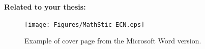 \textbf{Related to your thesis:}
\begin{description}
	\item[\PVerb{\school}] 
	\item[\PVerb{\cotutele}]
	\item[\PVerb{\covertype}]
	\item[\PVerb{\keywordnames}]
	\item[\PVerb{\keywordFnames}]
	\item[\PVerb{\abstractT}]
	\item[\PVerb{\abstractTF}]
	\item[\PVerb{\subjectname}]
	\item[\PVerb{\title}]
	\item[\PVerb{\subtitle}]
	\item[\PVerb{\titleF}]
	\item[\PVerb{\subtitleF}]
	\item[\PVerb{\deptname}]
	\item[\PVerb{\deptnumber}]
	\item[\PVerb{\addcomue}]
	\item[\PVerb{\cityname}]
	\item[\PVerb{\theseorder}]
	\item[\PVerb{\labname}]
	\item[\PVerb{\advisor}]
	\item[\PVerb{\rapporteur}]
	\item[\PVerb{\examinateur}]
	\item[\PVerb{\invite}]
	\item[\PVerb{\president}]
\end{description}	


\begin{figure}[tb]
	\centering%
	\texttt{[image: Figures/MathStic-ECN.eps]}%
	\caption[Example of cover page.]{Example of cover page from the Microsoft Word version.}%
	\label{fig:mathstic-ecn}
\end{figure}



